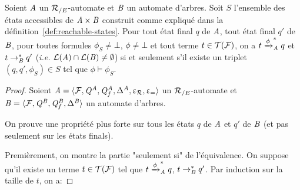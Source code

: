 \begin{lemma}
  Soient $\mathit A$ un ${\mathcal R_{/E}}$-automate et $\mathit B$ un automate d'arbres.
  Soit $S$ l'ensemble des états accessibles de $\mathit A\times \mathit B$ construit
  comme expliqué dans la définition~\ref{def:reachable-states}. 
  Pour tout état final $q$ de $\mathit A$, tout état final $q'$ de $\mathit B$, pour toutes formules $\phi_S\neq\bot$, $\phi\neq \bot$ et
  tout terme $t\in\mathcal{T(F)}$, on a $t\xrightarrow{\phi}^*_\mathit A q$ et $t \rightarrow_\mathit B^* q'$
  (\textit{i.e.} $\mathcal{L}(\mathit A)\cap \mathcal{L}(\mathit B) \neq \emptyset$) si et seulement s'il existe un 
  triplet $(q,q',\phi_S)\in S$ tel que $\phi \models \phi_S$. 
\end{lemma}

\begin{proof}
  Soient $\mathit A =\langle \mathcal{F}, \mathit Q^\mathit A,\mathit Q^\mathit A_f,\Delta^\mathit A, \upvarepsilon_{\mathcal R}, \upvarepsilon_{=} \rangle$
  un ${\mathcal R_{/E}}$-automate et $\mathit B=\langle \mathcal{F}, \mathit Q^\mathit B,\mathit Q^\mathit B_f,\Delta^\mathit B \rangle$ un automate d'arbres.  


On prouve une propriété plus forte sur tous les états $q$ de $\mathit A$ et $q'$ de $\mathit B$ 
(et pas seulement sur les états finals).

Premièrement, on montre la partie "seulement si" de l'équivalence.
On suppose qu'il 
existe un terme $t\in\mathcal{T(F)}$ tel que $t\xrightarrow{\phi}^*_\mathit A q$, $t \rightarrow_\mathit B^* q'$.
Par induction sur la taille de $t$, on a:


\end{proof}
